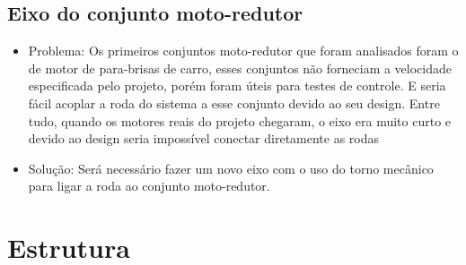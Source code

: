 \subsection{Eixo do conjunto moto-redutor}
 \begin{itemize}
  \item Problema: Os primeiros conjuntos moto-redutor que foram analisados foram o de motor de para-brisas de carro, esses conjuntos não forneciam a velocidade especificada pelo projeto, porém foram úteis para testes de controle. E seria fácil acoplar a roda do sistema a esse conjunto devido ao seu design. Entre tudo, quando os motores reais do projeto chegaram, o eixo era muito curto e devido ao design seria impossível conectar diretamente as rodas
  \item Solução: Será necessário fazer um novo eixo com o uso do torno mecânico para ligar a roda ao conjunto moto-redutor.

 \end{itemize}

\section{Estrutura}

